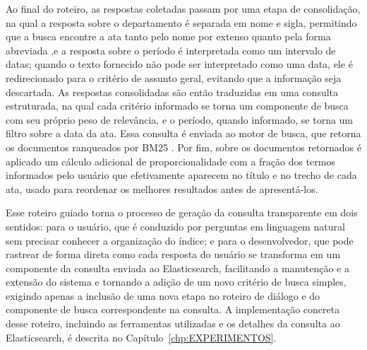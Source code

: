 Ao final do roteiro, as respostas coletadas passam por uma etapa de consolidação, na qual a resposta sobre o departamento é separada em nome e sigla,  permitindo que a busca encontre a ata tanto pelo nome por extenso quanto pela forma abreviada ,e a resposta sobre o período é interpretada como um intervalo de datas; quando o texto fornecido não pode ser interpretado como uma data, ele é redirecionado para o critério de assunto geral, evitando que a informação seja descartada. As respostas consolidadas são então traduzidas em uma consulta estruturada, na qual cada critério informado se torna um componente de busca com seu próprio peso de relevância, e o período, quando informado, se torna um filtro sobre a data da ata. Essa consulta é enviada ao motor de busca, que retorna os documentos ranqueados por BM25 \cite{IBMElasticsearch}. Por fim, sobre os documentos retornados é aplicado um cálculo adicional de proporcionalidade com a fração dos termos informados pelo usuário que efetivamente aparecem no título e no trecho de cada ata, usado para reordenar os melhores resultados antes de apresentá-los.

Esse roteiro guiado torna o processo de geração da consulta transparente em dois sentidos: para o usuário, que é conduzido por perguntas em linguagem natural sem precisar conhecer a organização do índice; e para o desenvolvedor, que pode rastrear de forma direta como cada resposta do usuário se transforma em um componente da consulta enviada ao Elasticsearch, facilitando a manutenção e a extensão do sistema e tornando a adição de um novo critério de busca simples, exigindo apenas a inclusão de uma nova etapa no roteiro de diálogo e do componente de busca correspondente na consulta. A implementação concreta desse roteiro, incluindo as ferramentas utilizadas e os detalhes da consulta ao Elasticsearch, é descrita no Capítulo~\ref{chp:EXPERIMENTOS}.
